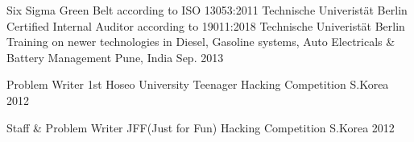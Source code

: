 

\begin{cvhonors}

  \cvhonor
    {}
    {Six Sigma Green Belt according to ISO 13053:2011} %
    {Technische Univeristät Berlin} %
    {}
  \cvhonor
    {}
    {Certified Internal Auditor according to 19011:2018} %
    {Technische Univeristät Berlin} %
    {} %
  \cvhonor
   {}
    {Training on newer technologies in Diesel, Gasoline systems, Auto Electricals \& Battery Management} %
    {Pune, India} %
    {Sep. 2013} %

  \cvhonor
    {Problem Writer} %
    {1st Hoseo University Teenager Hacking Competition} %
    {S.Korea} %
    {2012} %

  \cvhonor
    {Staff \& Problem Writer} %
    {JFF(Just for Fun) Hacking Competition} %
    {S.Korea} %
    {2012} %

\end{cvhonors}
